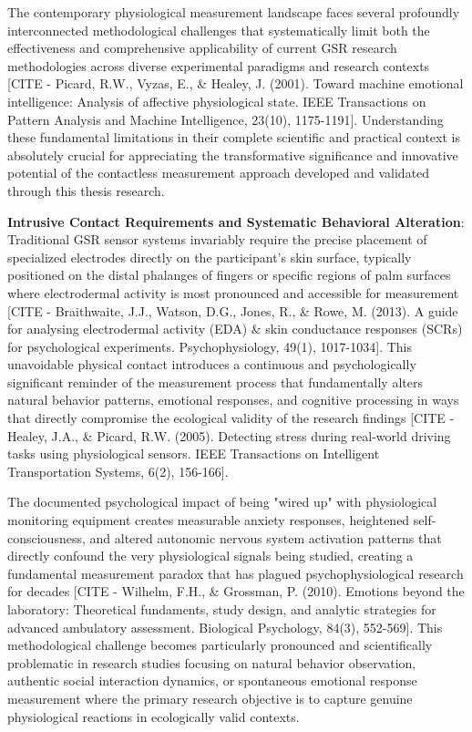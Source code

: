 \documentclass[12pt,a4paper]{report}
\begin{document}
The contemporary physiological measurement landscape faces several profoundly interconnected methodological challenges
that systematically limit both the effectiveness and comprehensive applicability of current GSR research methodologies
across diverse experimental paradigms and research
contexts [CITE - Picard, R.W., Vyzas, E., \& Healey, J. (2001). Toward machine emotional intelligence: Analysis of affective physiological state. IEEE Transactions on Pattern Analysis and Machine Intelligence, 23(10), 1175-1191].
Understanding these fundamental limitations in their complete scientific and practical context is absolutely crucial for
appreciating the transformative significance and innovative potential of the contactless measurement approach developed
and validated through this thesis research.

\textbf{Intrusive Contact Requirements and Systematic Behavioral Alteration}: Traditional GSR sensor systems invariably
require the precise placement of specialized electrodes directly on the participant's skin surface, typically positioned
on the distal phalanges of fingers or specific regions of palm surfaces where electrodermal activity is most pronounced
and accessible for
measurement [CITE - Braithwaite, J.J., Watson, D.G., Jones, R., \& Rowe, M. (2013). A guide for analysing electrodermal activity (EDA) \& skin conductance responses (SCRs) for psychological experiments. Psychophysiology, 49(1), 1017-1034].
This unavoidable physical contact introduces a continuous and psychologically significant reminder of the measurement
process that fundamentally alters natural behavior patterns, emotional responses, and cognitive processing in ways that
directly compromise the ecological validity of the research
findings [CITE - Healey, J.A., \& Picard, R.W. (2005). Detecting stress during real-world driving tasks using physiological sensors. IEEE Transactions on Intelligent Transportation Systems, 6(2), 156-166].

The documented psychological impact of being "wired up" with physiological monitoring equipment creates measurable
anxiety responses, heightened self-consciousness, and altered autonomic nervous system activation patterns that directly
confound the very physiological signals being studied, creating a fundamental measurement paradox that has plagued
psychophysiological research for
decades [CITE - Wilhelm, F.H., \& Grossman, P. (2010). Emotions beyond the laboratory: Theoretical fundaments, study design, and analytic strategies for advanced ambulatory assessment. Biological Psychology, 84(3), 552-569].
This methodological challenge becomes particularly pronounced and scientifically problematic in research studies
focusing on natural behavior observation, authentic social interaction dynamics, or spontaneous emotional response
measurement where the primary research objective is to capture genuine physiological reactions in ecologically valid
contexts.
\end{document}
